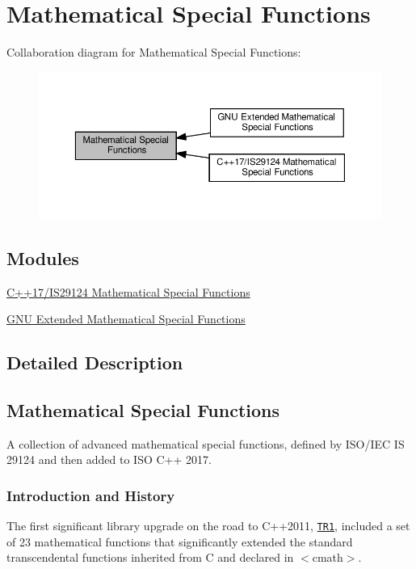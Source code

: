 \hypertarget{group__mathsf}{}\section{Mathematical Special Functions}
\label{group__mathsf}
Collaboration diagram for Mathematical Special Functions\+:
\nopagebreak
\begin{figure}[H]
\begin{center}
\leavevmode
\includegraphics[width=350pt]{group__mathsf}
\end{center}
\end{figure}
\subsection*{Modules}
\begin{DoxyCompactItemize}
\item 
\hyperlink{group__mathsf__std}{C++17/\+I\+S29124 Mathematical Special Functions}
\item 
\hyperlink{group__mathsf__gnu}{G\+N\+U Extended Mathematical Special Functions}
\end{DoxyCompactItemize}


\subsection{Detailed Description}
\hypertarget{group__mathsf_mathsf_desc}{}\subsection{Mathematical Special Functions}\label{group__mathsf_mathsf_desc}
A collection of advanced mathematical special functions, defined by I\+S\+O/\+I\+EC IS 29124 and then added to I\+SO C++ 2017.\hypertarget{group__mathsf_mathsf_intro}{}\subsubsection{Introduction and History}\label{group__mathsf_mathsf_intro}
The first significant library upgrade on the road to C++2011, \href{http://www.open-std.org/JTC1/SC22/WG21/docs/papers/2005/n1836.pdf}{\tt T\+R1}, included a set of 23 mathematical functions that significantly extended the standard transcendental functions inherited from C and declared in $<$cmath$>$.

